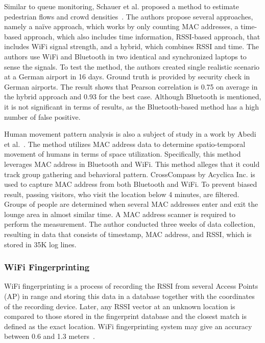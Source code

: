 	Similar to queue monitoring, Schauer et al. proposed a method to estimate pedestrian flows and crowd densities~\cite{thesis011}. The authors propose several approaches, namely a na\"{i}ve approach, which works by only counting MAC addresses, a time-based approach, which also includes time information, \ac{RSSI}-based approach, that includes WiFi signal strength, and a hybrid, which combines \ac{RSSI} and time. The authors use WiFi and Bluetooth in two identical and synchronized laptops to sense the signals. To test the method, the authors created single realistic scenario at a German airport in 16 days.
	Ground truth is provided by security check in German airports. The result shows that Pearson correlation is 0.75 on average in the hybrid approach and 0.93 for the best case. Although Bluetooth is mentioned, it is not significant in terms of results, as the Bluetooth-based method has a high number of false positive. 

	Human movement pattern analysis is also a subject of study in a work by Abedi et al.~\cite{thesis017}. The method utilizes \ac{MAC} address data to determine spatio-temporal movement of humans in terms of space utilization. Specifically, this method leverages \ac{MAC} address in Bluetooth and WiFi. This method alleges that it could track group gathering and behavioral pattern. CrossCompass by Acyclica Inc. is used to capture \ac{MAC} address from both Bluetooth and WiFi. To prevent biased result, passing visitors, who visit the location below 4 minutes, are filtered. Groups of people are determined when several \ac{MAC} addresses enter and exit the lounge area in almost similar time. A \ac{MAC} address scanner is required to perform the measurement. The author conducted three weeks of data collection, resulting in data that consists of timestamp, \ac{MAC} address, and \ac{RSSI}, which is stored in 35K log lines.

	

	







	\subsubsection{WiFi Fingerprinting} %
	\label{ssub:wifi_fingerprinting}
	WiFi fingerprinting is a process of recording the \ac{RSSI} from several Access Points (\ac{AP}) in range and storing this data in a database together with the coordinates of the recording device. Later, any \ac{RSSI} vector at an unknown location is compared to those stored in the fingerprint database and the closest match is defined as the exact location. WiFi fingerprinting system may give an accuracy between 0.6 and 1.3 meters~\cite{Youssef2008}.

